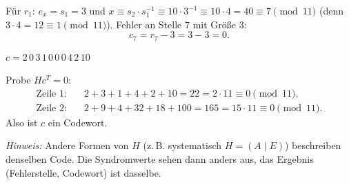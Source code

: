  Für $r_1$: $e_x = s_1 = 3$ und $x \equiv s_2 \cdot s_1^{-1} \equiv 10 \cdot 3^{-1} \equiv 10 \cdot 4 = 40 \equiv 7 \pmod{11}$
(denn $3 \cdot 4 = 12 \equiv 1 \pmod{11}$). Fehler an Stelle $7$ mit Größe $3$:
\[
c_7 = r_7 - 3 = 3 - 3 = 0 .
\]
\begin{ergebnis} $c = 2\,0\,3\,1\,0\,0\,0\,4\,2\,10$ \end{ergebnis}

 Probe $H c^T = 0$:
\begin{align*}
\text{Zeile 1:}\quad & 2 + 3 + 1 + 4 + 2 + 10 = 22 = 2 \cdot 11 \equiv 0 \pmod{11},\\
\text{Zeile 2:}\quad & 2 + 9 + 4 + 32 + 18 + 100 = 165 = 15 \cdot 11 \equiv 0 \pmod{11}.
\end{align*}
Also ist $c$ ein Codewort. \checkmark

\medskip
{\small\textit{Hinweis:} Andere Formen von $H$ (z.\,B. systematisch $H = (A \mid E)$) beschreiben denselben Code.
Die Syndromwerte sehen dann anders aus, das Ergebnis (Fehlerstelle, Codewort) ist dasselbe.}
